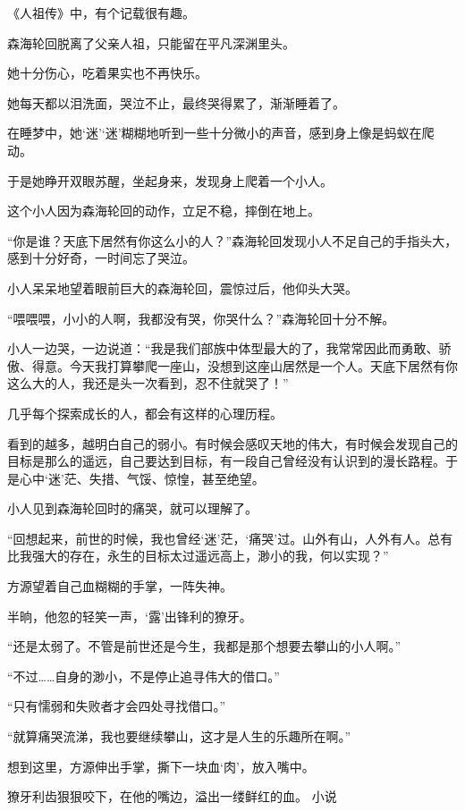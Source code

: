 \begin{this_body}
《人祖传》中，有个记载很有趣。

森海轮回脱离了父亲人祖，只能留在平凡深渊里头。

她十分伤心，吃着果实也不再快乐。

她每天都以泪洗面，哭泣不止，最终哭得累了，渐渐睡着了。

在睡梦中，她‘迷’‘迷’糊糊地听到一些十分微小的声音，感到身上像是蚂蚁在爬动。

于是她睁开双眼苏醒，坐起身来，发现身上爬着一个小人。

这个小人因为森海轮回的动作，立足不稳，摔倒在地上。

“你是谁？天底下居然有你这么小的人？”森海轮回发现小人不足自己的手指头大，感到十分好奇，一时间忘了哭泣。

小人呆呆地望着眼前巨大的森海轮回，震惊过后，他仰头大哭。

“喂喂喂，小小的人啊，我都没有哭，你哭什么？”森海轮回十分不解。

小人一边哭，一边说道：“我是我们部族中体型最大的了，我常常因此而勇敢、骄傲、得意。今天我打算攀爬一座山，没想到这座山居然是一个人。天底下居然有你这么大的人，我还是头一次看到，忍不住就哭了！”

几乎每个探索成长的人，都会有这样的心理历程。

看到的越多，越明白自己的弱小。有时候会感叹天地的伟大，有时候会发现自己的目标是那么的遥远，自己要达到目标，有一段自己曾经没有认识到的漫长路程。于是心中‘迷’茫、失措、气馁、惊惶，甚至绝望。

小人见到森海轮回时的痛哭，就可以理解了。

“回想起来，前世的时候，我也曾经‘迷’茫，‘痛哭’过。山外有山，人外有人。总有比我强大的存在，永生的目标太过遥远高上，渺小的我，何以实现？”

方源望着自己血糊糊的手掌，一阵失神。

半晌，他忽的轻笑一声，‘露’出锋利的獠牙。

“还是太弱了。不管是前世还是今生，我都是那个想要去攀山的小人啊。”

“不过……自身的渺小，不是停止追寻伟大的借口。”

“只有懦弱和失败者才会四处寻找借口。”

“就算痛哭流涕，我也要继续攀山，这才是人生的乐趣所在啊。”

想到这里，方源伸出手掌，撕下一块血‘肉’，放入嘴中。

獠牙利齿狠狠咬下，在他的嘴边，溢出一缕鲜红的血。 小说

\end{this_body}

